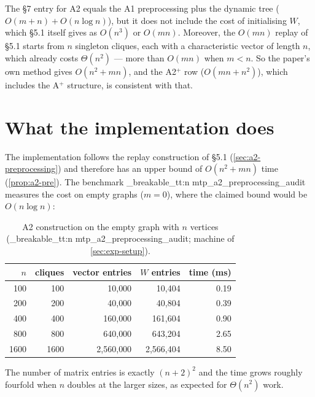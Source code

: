 \documentclass[11pt,a4paper,oneside]{report}
\theoremstyle{plain}
\theoremstyle{definition}
\theoremstyle{remark}
\DeclareRobustCommand{\code}[1]{\mtp_breakable_tt:n {#1}}
\begin{document}
The \S7 entry for A2 equals the A1 preprocessing plus the dynamic tree (\(O(m+n)+O(n\log n)\)),
but it does not include the cost of initialising \(W\), which \S5.1 itself gives as \(O(n^3)\)
or \(O(mn)\). Moreover, the \(O(mn)\) replay of \S5.1 starts from \(n\) singleton cliques, each
with a characteristic vector of length \(n\), which already costs \(\Theta(n^2)\) --- more than
\(O(mn)\) when \(m<n\). So the paper's own method gives \(O(n^2+mn)\), and the A2\(^+\) row
(\(O(mn+n^2)\)), which includes the A\(^+\) structure, is consistent with that.

\section{What the implementation does}
The implementation follows the replay construction of \S5.1 (\cref{sec:a2-preprocessing}) and therefore has an upper bound of
\(O(n^2+mn)\) time (\cref{prop:a2-pre}). The benchmark \code{mtp_a2_preprocessing_audit}
measures the cost on empty graphs (\(m=0\)), where the claimed bound would be
\(O(n\log n)\):

\begin{table}[ht]
\centering\small
\caption[A2 preprocessing on empty graphs]{A2 construction on the empty graph with \(n\)
vertices (\code{mtp_a2_preprocessing_audit}; machine of \cref{sec:exp-setup}).}\label{tab:preproc-empty}
\begin{tabular}{@{}rrrrr@{}}
\toprule
\(n\) & cliques & vector entries & \(W\) entries & time (ms)\\
\midrule
100 & 100 & 10{,}000 & 10{,}404 & 0.19\\
200 & 200 & 40{,}000 & 40{,}804 & 0.39\\
400 & 400 & 160{,}000 & 161{,}604 & 0.90\\
800 & 800 & 640{,}000 & 643{,}204 & 2.65\\
1600 & 1600 & 2{,}560{,}000 & 2{,}566{,}404 & 8.50\\
\bottomrule
\end{tabular}
\end{table}

The number of matrix entries is exactly \((n+2)^2\) and the time grows roughly fourfold when
\(n\) doubles at the larger sizes, as expected for \(\Theta(n^2)\) work.
\end{document}
